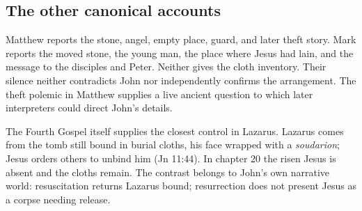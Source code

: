 \subsection{The other canonical accounts}

Matthew reports the stone, angel, empty place, guard, and later theft story.
Mark reports the moved stone, the young man, the place where Jesus had lain,
and the message to the disciples and Peter. Neither gives the cloth inventory.
Their silence neither contradicts John nor independently confirms the
arrangement. The theft polemic in Matthew supplies a live ancient question to
which later interpreters could direct John's details.

The Fourth Gospel itself supplies the closest control in Lazarus. Lazarus comes
from the tomb still bound in burial cloths, his face wrapped with a
\emph{soudarion}; Jesus orders others to unbind him (Jn 11:44). In chapter 20
the risen Jesus is absent and the cloths remain. The contrast belongs to John's
own narrative world: resuscitation returns Lazarus bound; resurrection does not
present Jesus as a corpse needing release.

